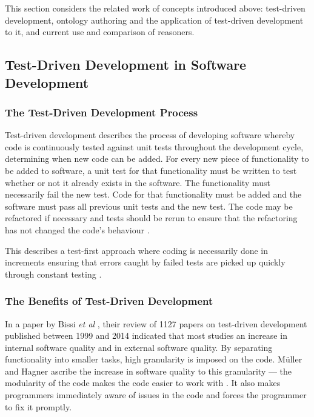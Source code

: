 \documentclass[draft]{sig-alternate-05-2015}
\begin{document}
This section considers the related work of concepts introduced above: test-driven development, ontology authoring and the application of test-driven development to it, and current use and comparison of reasoners.

\subsection{Test-Driven Development in Software Development}

\subsubsection{The Test-Driven Development Process}

Test-driven development describes the process of developing software whereby code is continuously tested against unit tests throughout the development cycle, determining when new code can be added. For every new piece of functionality to be added to software, a unit test for that functionality must be written to test whether or not it already exists in the software. The functionality must necessarily fail the new test. Code for that functionality must be added and the software must pass all previous unit tests and the new test. The code may be refactored if necessary and tests should be rerun to ensure that the refactoring has not changed the code's behaviour \cite{kumar2013comparative,DBLP:journals/infsof/PancurC11}.

This describes a test-first approach \cite{DBLP:journals/infsof/BissiNE16} where coding is necessarily done in increments ensuring that errors caught by failed tests are picked up quickly through constant testing \cite{DBLP:journals/iee/MullerH02}.

\subsubsection{The Benefits of Test-Driven Development}

In a paper by Bissi \textit{et al} \cite{DBLP:journals/infsof/BissiNE16}, their review of 1127 papers on test-driven development published between 1999 and 2014 indicated that most studies an increase in internal software quality and in external software quality. By separating functionality into smaller tasks, high granularity is imposed on the code. M\"{u}ller and Hagner ascribe the increase in software quality to this granularity --- the modularity of the code makes the code easier to work with \cite{DBLP:journals/iee/MullerH02}. It also makes programmers immediately aware of issues in the code and forces the programmer to fix it promptly.
\end{document}

